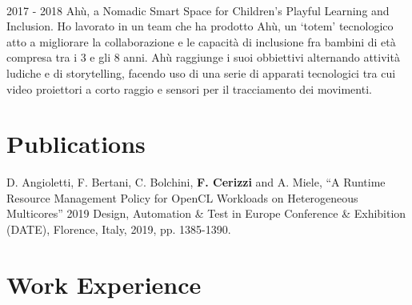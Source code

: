 \documentclass[letterpaper]{twentysecondcvit} %
\begin{document}
\begin{twenty}
	\\
	\twentyitem
	{2017 - 2018}
	{}
	{Ahù, a Nomadic Smart Space for Children’s Playful Learning and Inclusion.}
	{}
	{
		Ho lavorato in un team che ha prodotto Ahù, un `totem' tecnologico atto a migliorare la collaborazione e le capacità di inclusione fra bambini di età compresa tra i 3 e gli 8 anni. Ahù raggiunge i suoi obbiettivi alternando attività ludiche e di storytelling, facendo uso di una serie di apparati tecnologici tra cui video proiettori a corto raggio e sensori per il tracciamento dei movimenti.
			{
			}
	}
	{\footnotesize{}}
	\\
\end{twenty}


\section{Publications}
D. Angioletti, F. Bertani, C. Bolchini, \textbf{F. Cerizzi} and A. Miele, “A Runtime Resource Management Policy for OpenCL Workloads on Heterogeneous Multicores” 2019 Design, Automation \& Test in Europe Conference \& Exhibition (DATE), Florence, Italy, 2019, pp. 1385-1390.\\ {\footnotesize{}}
\vspace{2mm}


\newpage
\makenewprofile


\section{Work Experience}
\end{document}
